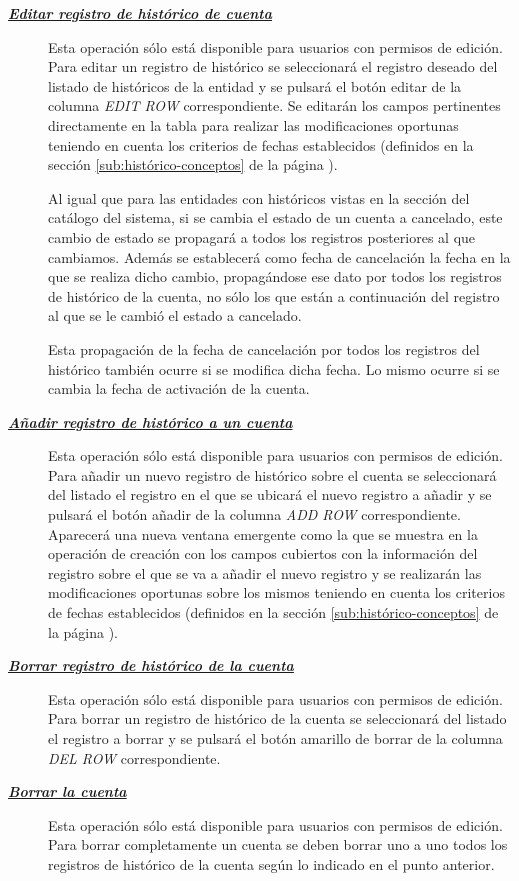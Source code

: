 \begin{description}
\item[\underline{\textsl{\textbf{Editar registro de histórico de cuenta}}}] Esta operación sólo está disponible para usuarios con permisos de edición.
Para editar un registro de histórico se seleccionará el registro deseado del listado de históricos de la entidad y se pulsará el botón editar de la columna \textit{EDIT ROW} correspondiente. Se editarán los campos pertinentes directamente en la tabla para realizar las modificaciones oportunas teniendo en cuenta los criterios de fechas establecidos (definidos en la sección \ref{sub:histórico-conceptos} de la página \pageref{sub:histórico-conceptos}).

Al igual que para las entidades con históricos vistas en la sección del catálogo del sistema, si se cambia el estado de un cuenta a cancelado, este cambio de estado se propagará a todos los registros posteriores al que cambiamos. Además se establecerá como fecha de cancelación la fecha en la que se realiza dicho cambio, propagándose ese dato por todos los registros de histórico de la cuenta, no sólo los que están a continuación del registro al que se le cambió el estado a cancelado.

Esta propagación de la fecha de cancelación por todos los registros del histórico  también ocurre si se modifica dicha fecha. Lo mismo ocurre si se cambia la fecha de activación de la cuenta.

\item[\underline{\textsl{\textbf{Añadir registro de histórico a un cuenta}}}] Esta operación sólo está disponible para usuarios con permisos de edición.
Para añadir un nuevo registro de histórico sobre el cuenta se seleccionará del listado el registro en el que se ubicará el nuevo registro a añadir y se pulsará el botón añadir de la columna \textit{ADD ROW} correspondiente. Aparecerá una nueva ventana emergente como la que se muestra en la operación de creación  con los campos cubiertos con la información del registro sobre el que se va a añadir el nuevo registro y se realizarán las modificaciones oportunas sobre los mismos teniendo en cuenta los criterios de fechas establecidos (definidos en la sección \ref{sub:histórico-conceptos} de la página \pageref{sub:histórico-conceptos}).


\item[\underline{\textsl{\textbf{Borrar registro de histórico de la cuenta}}}] Esta operación sólo está disponible para usuarios con permisos de edición.
Para borrar un registro de histórico de la cuenta se seleccionará del listado el registro a borrar y se pulsará el botón amarillo de borrar de la columna \textit{DEL ROW} correspondiente.

\item[\underline{\textsl{\textbf{Borrar la cuenta}}}] Esta operación sólo está disponible para usuarios con permisos de edición.
Para borrar completamente un cuenta se deben borrar uno a uno todos los registros de histórico de la cuenta según lo indicado en el punto anterior. 
\end{description}




